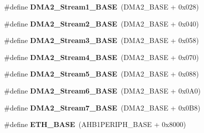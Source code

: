 \begin{DoxyCompactItemize}
\item 
\hypertarget{group___peripheral__memory__map_ga35512bdc3f5e9df4557c2fbe7935d0b1}{\#define {\bfseries D\-M\-A2\-\_\-\-Stream1\-\_\-\-B\-A\-S\-E}~(D\-M\-A2\-\_\-\-B\-A\-S\-E + 0x028)}\label{group___peripheral__memory__map_ga35512bdc3f5e9df4557c2fbe7935d0b1}

\item 
\hypertarget{group___peripheral__memory__map_gaed33a06f08188466f2ede06160984e9a}{\#define {\bfseries D\-M\-A2\-\_\-\-Stream2\-\_\-\-B\-A\-S\-E}~(D\-M\-A2\-\_\-\-B\-A\-S\-E + 0x040)}\label{group___peripheral__memory__map_gaed33a06f08188466f2ede06160984e9a}

\item 
\hypertarget{group___peripheral__memory__map_gaf3a9480e08c6ae94f4482e0cdaebdd17}{\#define {\bfseries D\-M\-A2\-\_\-\-Stream3\-\_\-\-B\-A\-S\-E}~(D\-M\-A2\-\_\-\-B\-A\-S\-E + 0x058)}\label{group___peripheral__memory__map_gaf3a9480e08c6ae94f4482e0cdaebdd17}

\item 
\hypertarget{group___peripheral__memory__map_gad1e67740e6301233473f64638145dd1f}{\#define {\bfseries D\-M\-A2\-\_\-\-Stream4\-\_\-\-B\-A\-S\-E}~(D\-M\-A2\-\_\-\-B\-A\-S\-E + 0x070)}\label{group___peripheral__memory__map_gad1e67740e6301233473f64638145dd1f}

\item 
\hypertarget{group___peripheral__memory__map_gaed1460fdc407b6decfbffccb0260d0af}{\#define {\bfseries D\-M\-A2\-\_\-\-Stream5\-\_\-\-B\-A\-S\-E}~(D\-M\-A2\-\_\-\-B\-A\-S\-E + 0x088)}\label{group___peripheral__memory__map_gaed1460fdc407b6decfbffccb0260d0af}

\item 
\hypertarget{group___peripheral__memory__map_ga5e81174c96fd204fa7c82c815e85c8e6}{\#define {\bfseries D\-M\-A2\-\_\-\-Stream6\-\_\-\-B\-A\-S\-E}~(D\-M\-A2\-\_\-\-B\-A\-S\-E + 0x0\-A0)}\label{group___peripheral__memory__map_ga5e81174c96fd204fa7c82c815e85c8e6}

\item 
\hypertarget{group___peripheral__memory__map_gaa9faa708ad2440d24eb1064cba9bb06d}{\#define {\bfseries D\-M\-A2\-\_\-\-Stream7\-\_\-\-B\-A\-S\-E}~(D\-M\-A2\-\_\-\-B\-A\-S\-E + 0x0\-B8)}\label{group___peripheral__memory__map_gaa9faa708ad2440d24eb1064cba9bb06d}

\item 
\hypertarget{group___peripheral__memory__map_gad965a7b1106ece575ed3da10c45c65cc}{\#define {\bfseries E\-T\-H\-\_\-\-B\-A\-S\-E}~(A\-H\-B1\-P\-E\-R\-I\-P\-H\-\_\-\-B\-A\-S\-E + 0x8000)}\label{group___peripheral__memory__map_gad965a7b1106ece575ed3da10c45c65cc}


\end{DoxyCompactItemize}
